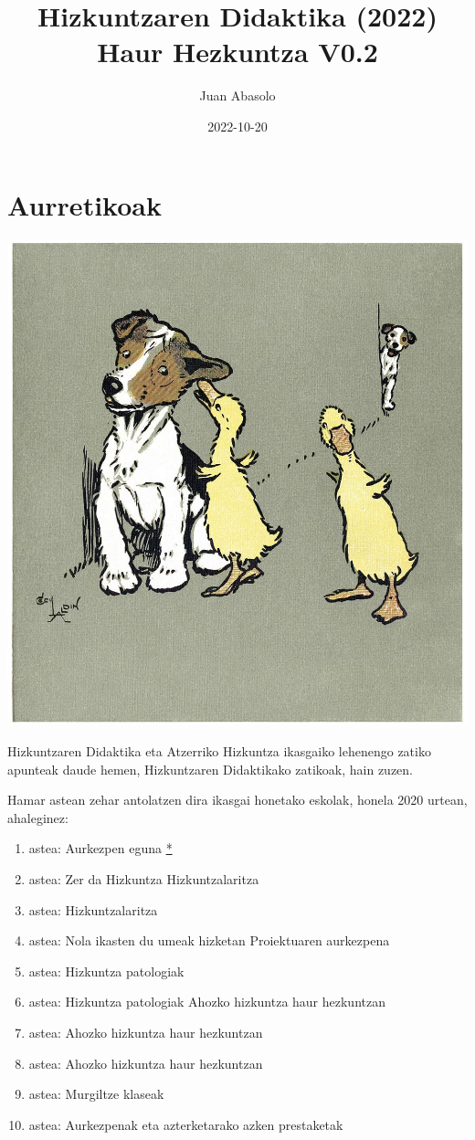 \documentclass[
]{book}
\title{Hizkuntzaren Didaktika (2022) Haur Hezkuntza V0.2}
\author{Juan Abasolo}
\date{2022-10-20}
\providecommand{\tightlist}{%
  \setlength{\itemsep}{0pt}\setlength{\parskip}{0pt}}
\begin{document}
\maketitle

{
\setcounter{tocdepth}{1}
\tableofcontents
}
\hypertarget{Aurretikoak}{%
\chapter*{Aurretikoak}\label{Aurretikoak}}

\includegraphics{assets/scare-quacks-1200.jpg}

Hizkuntzaren Didaktika eta Atzerriko Hizkuntza ikasgaiko lehenengo zatiko apunteak daude hemen, Hizkuntzaren Didaktikako zatikoak, hain zuzen.

Hamar astean zehar antolatzen dira ikasgai honetako eskolak, honela 2020 urtean, ahaleginez:

\begin{enumerate}
\def\labelenumi{\arabic{enumi}.}
\tightlist
\item
  astea: Aurkezpen eguna \href{../diapoak/}{*}
\item
  astea: Zer da Hizkuntza \textbar{} Hizkuntzalaritza
\item
  astea: Hizkuntzalaritza
\item
  astea: Nola ikasten du umeak hizketan \textbar{} Proiektuaren aurkezpena
\item
  astea: Hizkuntza patologiak
\item
  astea: Hizkuntza patologiak \textbar{} Ahozko hizkuntza haur hezkuntzan
\item
  astea: Ahozko hizkuntza haur hezkuntzan
\item
  astea: Ahozko hizkuntza haur hezkuntzan
\item
  astea: Murgiltze klaseak
\item
  astea: Aurkezpenak eta azterketarako azken prestaketak
\end{enumerate}
\end{document}
